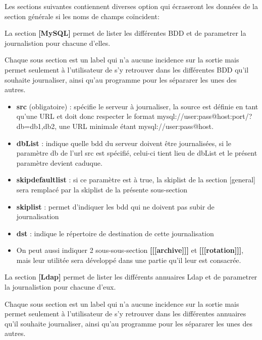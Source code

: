 \vspace{2em}
Les sections suivantes contiennent diverses option qui écraseront les données de la section générale si les noms de champs coïncident:

La section \textbf{[MySQL]} permet de lister les différentes BDD et de parametrer la journalistion pour chacune d'elles.

Chaque sous section est un label qui n'a aucune incidence sur la sortie mais permet seulement à l'utilisateur de s'y retrouver dans les différentes BDD qu'il souhaite journaliser, ainsi qu'au programme pour les sépararer les unes des autres.
\begin{itemize}
\item \textbf{src} (obligatoire) : spécifie le serveur à journaliser, la source est définie en tant qu'une URL et doit donc respecter le format mysql://user:pass@host:port/?db=db1,db2, une URL minimale étant mysql://user:pass@host.
\item \textbf{dbList} : indique quelle bdd du serveur doivent être journalisées, si le paramètre db de l'url src est spécifié, celui-ci tient lieu de dbList et le présent paramètre devient caduque.
\item \textbf{skipdefaultlist} : si ce paramètre est à true, la skiplist de la section [general] sera remplacé par la skiplist de la présente sous-section
\item \textbf{skiplist} : permet d'indiquer les bdd qui ne doivent pas subir de journalisation
\item \textbf{dst} : indique le répertoire de destination de cette journalisation
\item 	On peut aussi indiquer 2 sous-sous-section \textbf{[[[archive]]]} et \textbf{[[[rotation]]]}, mais leur utilitée sera développé dans une partie qu'il leur est consacrée.
\end{itemize}

\newpage

La section \textbf{[Ldap]} permet de lister les différents annuaires Ldap et de parametrer la journalistion pour chacune d'eux.

Chaque sous section est un label qui n'a aucune incidence sur la sortie mais permet seulement à l'utilisateur de s'y retrouver dans les différentes annuaires qu'il souhaite journaliser, ainsi qu'au programme pour les sépararer les unes des autres.

